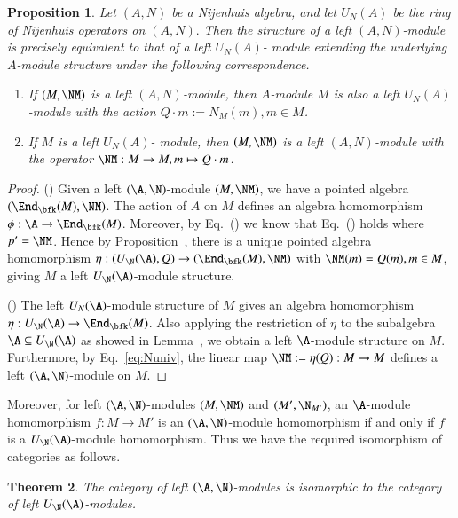 \documentclass[12pt]{amsart}
\newcommand{\delete}[1]{}
\newtheorem{theorem}{Theorem}[section]
\newtheorem{prop}[theorem]{Proposition}
\theoremstyle{definition}
\newtheorem{exam}[theorem]{Example}
\begin{document}
\begin{prop}
Let $(A,N)$ be a Nijenhuis algebra, and let $U_N(A)$ be the ring of Nijenhuis operators on $(A,N).$ Then the structure of a left $(A, N)$-module is precisely equivalent to that of a left $U_N(A)$-
module extending the underlying $A$-module structure under the following correspondence.
\begin{enumerate}
    \item {}
If $(M,\NM)$ is a left $(A,N)$-module, then $A$-module $M$ is also a left $U_N(A)$-module with the
action $Q\cdot m:=N_M(m), m\in M$.
    \item {}
  If $M$ is a left $U_N(A)$-
module, then $(M,\NM)$ is a left $(A,N)$-module with the
operator $\NM:M\rightarrow M, m\mapsto Q\cdot m$.
\end{enumerate}
\end{prop}
%
\begin{proof}
() Given a left $(\A,\N)$-module $(M, \NM)$, we have a pointed algebra $(\End_{\bfk}(M), \NM)$. The action of $A$ on $M$ defines an algebra homomorphism $\phi: \A \to \End_{\bfk}(M)$. Moreover, by Eq.~() we know that Eq.~() holds where $p'=\NM$. Hence by Proposition~, there is a unique pointed algebra homomorphism $\eta:(U_{\N}(\A), Q) \to (\End_{\bfk}(M), \NM)$ with $\NM(m)=Q(m), m\in M$, giving $M$ a left $U_{\N}(\A)$-module structure.

()  The left $U_{N}(\A)$-module structure of $M$ gives an algebra homomorphism $\eta: U_{\N}(\A) \to \End_{\bfk}(M)$. Also applying the restriction of $\eta$ to the subalgebra $\A \subseteq U_{\N}(\A)$ as showed in Lemma~, we obtain a left $\A$-module structure on $M$. Furthermore, by Eq.~\eqref{eq:Nuniv}, the linear map $\NM:= \eta(Q):M\rightarrow M$ defines a left $(\A,\N)$-module on $M$. 
 
\end{proof}  
Moreover, for left $(\A,\N)$-modules $(M, \NM)$ and $(M', \N_{M'})$, an $\A$-module homomorphism $ f: M\rightarrow M'$ is an $(\A,\N)$-module homomorphism if and only if $f$ is a $ U_{\N}(\A)$-module homomorphism. Thus we have the required isomorphism of categories as follows.    
\begin{theorem} 
The category of left $(\A,\N)$-modules is isomorphic to the category of left $U_{\N}(\A)$-modules.
\end{theorem}
% 
\delete{
\begin{exam} \Shilong{lack examples}We revisit the example at the end of Section~\mref{ss:decomp}. Let $ \bfk$ be any commutative ring and $\lambda\in \bfk$, then $ P=-\lambda : \bfk\rightarrow \bfk$ is a Rota-Baxter operator of weight $\lambda$. Then $U_{RB}(\bfk, P)=\bfk[t]/\langle t(t+\lambda)\rangle$. In fact, $U_{RB}(\bfk, P)$ is the Hecke algebra of $S_2$ over $\bfk$ with parameter $q=\lambda-1$.
\end{exam}
}
\end{document}
